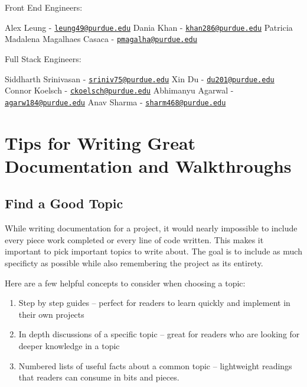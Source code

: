 \documentclass[]{book}
\begin{document}
Front End Engineers:

Alex Leung - \href{mailto:leung49@purdue.edu}{\nolinkurl{leung49@purdue.edu}}
Dania Khan - \href{mailto:khan286@purdue.edu}{\nolinkurl{khan286@purdue.edu}}
Patricia Madalena Magalhaes Casaca - \href{mailto:pmagalha@purdue.edu}{\nolinkurl{pmagalha@purdue.edu}}

Full Stack Engineers:

Siddharth Srinivasan - \href{mailto:sriniv75@purdue.edu}{\nolinkurl{sriniv75@purdue.edu}}
Xin Du - \href{mailto:du201@purdue.edu}{\nolinkurl{du201@purdue.edu}}
Connor Koelsch - \href{mailto:ckoelsch@purdue.edu}{\nolinkurl{ckoelsch@purdue.edu}}
Abhimanyu Agarwal - \href{mailto:agarw184@purdue.edu}{\nolinkurl{agarw184@purdue.edu}}
Anav Sharma - \href{mailto:sharm468@purdue.edu}{\nolinkurl{sharm468@purdue.edu}}

\hypertarget{tips-for-writing-great-documentation-and-walkthroughs}{%
\chapter{Tips for Writing Great Documentation and Walkthroughs}\label{tips-for-writing-great-documentation-and-walkthroughs}}

\hypertarget{find-a-good-topic}{%
\section{Find a Good Topic}\label{find-a-good-topic}}

While writing documentation for a project, it would nearly impossible to include every piece work completed or every line of code written. This makes it important to pick important topics to write about. The goal is to include as much specificty as possible while also remembering the project as its entirety.

Here are a few helpful concepts to consider when choosing a topic:

\begin{enumerate}
\def\labelenumi{\arabic{enumi}.}
\item
  Step by step guides -- perfect for readers to learn quickly and implement in their own projects
\item
  In depth discussions of a specific topic -- great for readers who are looking for deeper knowledge in a topic
\item
  Numbered lists of useful facts about a common topic -- lightweight readings that readers can consume in bits and pieces.
\end{enumerate}
\end{document}
